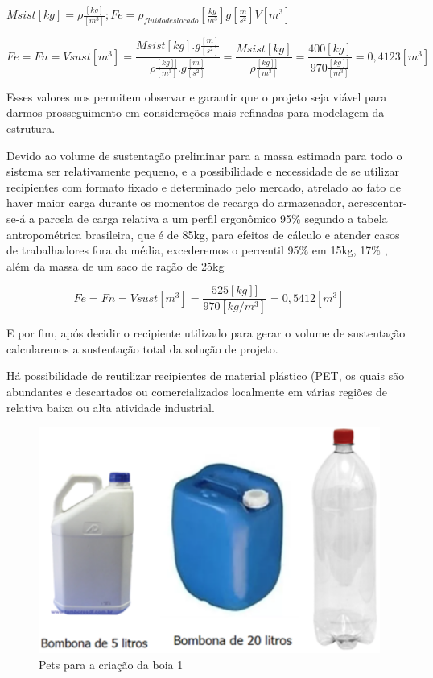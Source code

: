 $ Msist[kg] = \rho\frac{[kg]}{[m^3]}; Fe = \rho_{fluidodeslocado}[\frac{kg}{m^3}] g[\frac{m}{s^2}]V[m^3]$

\[Fe = Fn = Vsust[m^3] = \frac{Msist[kg].g\frac{[m]}{[s^2]}}{\rho\frac{[kg]]}{[m^3]}.g\frac{[m]}{[s^2]}} =\frac{Msist[kg]}{\rho\frac{[kg]]}{[m^3]}}  = \frac{400[kg]}{970\frac{[kg]]}{[m^3]}} = 0,4123[m^3]\]

Esses valores nos permitem observar e garantir que o projeto seja viável para darmos prosseguimento em considerações mais refinadas para modelagem da estrutura.

Devido ao volume de sustentação preliminar para a massa estimada para todo o sistema ser relativamente pequeno, e a possibilidade e necessidade de se utilizar recipientes com formato fixado e determinado pelo mercado, atrelado ao fato de haver maior carga durante os momentos de recarga do armazenador, acrescentar-se-á a parcela de carga relativa a um perfil ergonômico 95\% segundo a tabela antropométrica  brasileira, que é de 85kg, para efeitos de cálculo e atender casos de trabalhadores fora da média, excederemos o percentil 95\% em 15kg, 17\% , além da massa de um saco de ração de 25kg

\[Fe = Fn = Vsust[m^3] = \frac{525[kg]]}{970[kg/m^3]} = 0,5412 [m^3]\]

E por fim, após decidir o recipiente utilizado para gerar o volume de sustentação calcularemos a sustentação total da solução de projeto.

Há possibilidade de reutilizar recipientes de material plástico (PET, os quais são abundantes e descartados ou comercializados localmente em várias regiões de relativa baixa ou alta atividade industrial.

\begin{figure}[H]
 \centering
   \includegraphics[keepaspectratio=true,scale=0.8]{figuras/garrafas.eps}
 \caption{Pets para a criação da boia 1}
 \label{pets0}
\end{figure}

